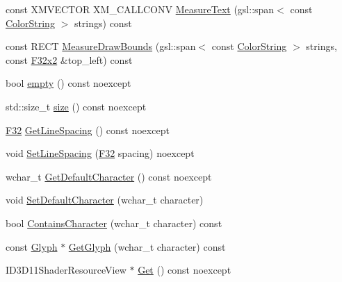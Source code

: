 \begin{DoxyCompactItemize}
\item 
const X\+M\+V\+E\+C\+T\+OR X\+M\+\_\+\+C\+A\+L\+L\+C\+O\+NV \mbox{\hyperlink{classmage_1_1rendering_1_1_sprite_font_a56471bbeedfa1982f05bf1b9055f74f1}{Measure\+Text}} (gsl\+::span$<$ const \mbox{\hyperlink{classmage_1_1rendering_1_1_color_string}{Color\+String}} $>$ strings) const
\item 
const R\+E\+CT \mbox{\hyperlink{classmage_1_1rendering_1_1_sprite_font_a661820d3d7b20a797966007cd712a76b}{Measure\+Draw\+Bounds}} (gsl\+::span$<$ const \mbox{\hyperlink{classmage_1_1rendering_1_1_color_string}{Color\+String}} $>$ strings, const \mbox{\hyperlink{namespacemage_aee4759dedc8def6c6dec26b5c7eddf29}{F32x2}} \&top\+\_\+left) const
\item 
bool \mbox{\hyperlink{classmage_1_1rendering_1_1_sprite_font_acc6d1e6ea5d1cb5ca55154a3f4cdc70e}{empty}} () const noexcept
\item 
std\+::size\+\_\+t \mbox{\hyperlink{classmage_1_1rendering_1_1_sprite_font_a4ea84a682a4f93ccd59a69c8d0c8d974}{size}} () const noexcept
\item 
\mbox{\hyperlink{namespacemage_aa97e833b45f06d60a0a9c4fc22ae02c0}{F32}} \mbox{\hyperlink{classmage_1_1rendering_1_1_sprite_font_af8a9229b449007440733cdd65d65b2f5}{Get\+Line\+Spacing}} () const noexcept
\item 
void \mbox{\hyperlink{classmage_1_1rendering_1_1_sprite_font_a0dc7afe54ffa5f2215efc739ba8dc2ed}{Set\+Line\+Spacing}} (\mbox{\hyperlink{namespacemage_aa97e833b45f06d60a0a9c4fc22ae02c0}{F32}} spacing) noexcept
\item 
wchar\+\_\+t \mbox{\hyperlink{classmage_1_1rendering_1_1_sprite_font_af50e0ef59bf9d4be7b402c71609de497}{Get\+Default\+Character}} () const noexcept
\item 
void \mbox{\hyperlink{classmage_1_1rendering_1_1_sprite_font_a7400d0574c96e4e204268d6cd5a5c356}{Set\+Default\+Character}} (wchar\+\_\+t character)
\item 
bool \mbox{\hyperlink{classmage_1_1rendering_1_1_sprite_font_a6f9adb6806acc990ac3feaa547f7f296}{Contains\+Character}} (wchar\+\_\+t character) const
\item 
const \mbox{\hyperlink{structmage_1_1rendering_1_1_glyph}{Glyph}} $\ast$ \mbox{\hyperlink{classmage_1_1rendering_1_1_sprite_font_aa56b305252b14f6ecf51738fccb16e93}{Get\+Glyph}} (wchar\+\_\+t character) const
\item 
I\+D3\+D11\+Shader\+Resource\+View $\ast$ \mbox{\hyperlink{classmage_1_1rendering_1_1_sprite_font_ab24067a24942427a39d88ca042da3484}{Get}} () const noexcept
\end{DoxyCompactItemize}
